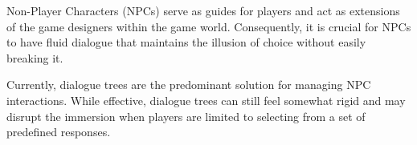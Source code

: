 









\fancyhead{} %

\fancyhead[C]{}
Non-Player Characters (NPCs) serve as guides for players and act as extensions of the game designers within the game world. Consequently, it is crucial for NPCs to have fluid dialogue that maintains the illusion of choice without easily breaking it.

Currently, dialogue trees are the predominant solution for managing NPC interactions. While effective, dialogue trees can still feel somewhat rigid and may disrupt the immersion when players are limited to selecting from a set of predefined responses.





















